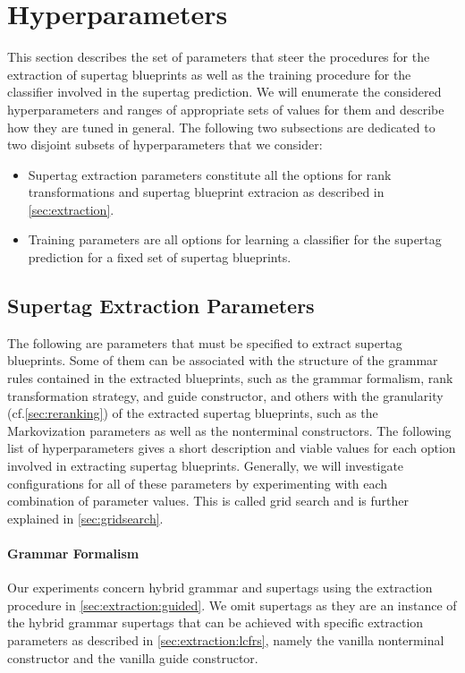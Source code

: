 \documentclass[../../document.tex]{subfiles}
\begin{document}
    \section{Hyperparameters}\label{sec:hyperparameters}
    This section describes the set of parameters that steer the procedures for the extraction of supertag blueprints as well as the training procedure for the classifier involved in the supertag prediction.
    We will enumerate the considered hyperparameters and ranges of appropriate sets of values for them and describe how they are tuned in general.
    The following two subsections are dedicated to two disjoint subsets of hyperparameters that we consider:
    \begin{itemize}
        \item Supertag extraction parameters constitute all the options for rank transformations and supertag blueprint extracion as described in \cref{sec:extraction}.
        \item Training parameters are all options for learning a classifier for the supertag prediction for a fixed set of supertag blueprints.
    \end{itemize}

    \subsection{Supertag Extraction Parameters}
    The following are parameters that must be specified to extract supertag blueprints.
    Some of them can be associated with the structure of the grammar rules contained in the extracted blueprints, such as the grammar formalism, rank transformation strategy, and guide constructor, and others with the granularity (cf.\@ \cref{sec:reranking}) of the extracted supertag blueprints, such as the Markovization parameters as well as the nonterminal constructors.
    The following list of hyperparameters gives a short description and viable values for each option involved in extracting supertag blueprints.
    Generally, we will investigate configurations for all of these parameters by experimenting with each combination of parameter values. This is called grid search and is further explained in \cref{sec:gridsearch}.

    \paragraph*{Grammar Formalism}
    Our experiments concern hybrid grammar and  supertags using the extraction procedure in \cref{sec:extraction:guided}.
    We omit  supertags as they are an instance of the hybrid grammar supertags that can be achieved with specific extraction parameters as described in \cref{sec:extraction:lcfrs}, namely the vanilla nonterminal constructor and the vanilla guide constructor.
\end{document}
